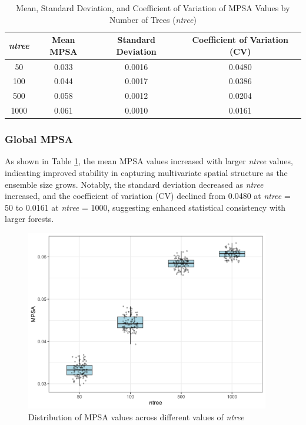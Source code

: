 \documentclass[
  a4paper,
  12pt]{article}
\begin{document}
\begin{table}[htb]
\centering
\caption{Mean, Standard Deviation, and Coefficient of Variation of MPSA Values by Number of Trees (\textit{ntree})}
\label{tab:mpsa_ntree_cv}
\begin{tabular}{cccc}
\toprule
\textit{ntree} & \textbf{Mean MPSA} & \textbf{Standard Deviation} & \textbf{Coefficient of Variation (CV)} \\
\midrule
50   & 0.033 & 0.0016  & 0.0480 \\
100  & 0.044 & 0.0017  & 0.0386 \\
500  & 0.058 & 0.0012  & 0.0204 \\
1000 & 0.061 & 0.0010   & 0.0161 \\
\bottomrule
\end{tabular}
\end{table}

\subsubsection{Global MPSA}\label{global-mpsa}

As shown in Table \ref{tab:mpsa_ntree_cv}, the mean MPSA values
increased with larger \emph{ntree} values, indicating improved stability
in capturing multivariate spatial structure as the ensemble size grows.
Notably, the standard deviation decreased as \emph{ntree} increased, and
the coefficient of variation (CV) declined from 0.0480 at \emph{ntree} =
50 to 0.0161 at \emph{ntree} = 1000, suggesting enhanced statistical
consistency with larger forests.

\begin{figure}[H]
\centering
\includegraphics[width=0.95\textwidth]{output/robustness/global_mpsa_boxplot.png}
\caption{\small Distribution of MPSA values across different values of \textit{ntree}}
\label{fig:global_mpsa_boxplot}
\end{figure}
\end{document}
